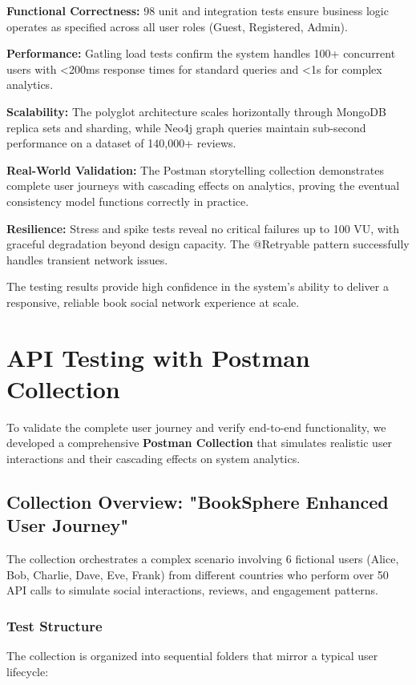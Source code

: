\textbf{Functional Correctness:} 98 unit and integration tests ensure business logic operates as specified across all user roles (Guest, Registered, Admin).

\textbf{Performance:} Gatling load tests confirm the system handles 100+ concurrent users with \textless200ms response times for standard queries and \textless1s for complex analytics.

\textbf{Scalability:} The polyglot architecture scales horizontally through MongoDB replica sets and sharding, while Neo4j graph queries maintain sub-second performance on a dataset of 140,000+ reviews.

\textbf{Real-World Validation:} The Postman storytelling collection demonstrates complete user journeys with cascading effects on analytics, proving the eventual consistency model functions correctly in practice.

\textbf{Resilience:} Stress and spike tests reveal no critical failures up to 100 VU, with graceful degradation beyond design capacity. The @Retryable pattern successfully handles transient network issues.

The testing results provide high confidence in the system's ability to deliver a responsive, reliable book social network experience at scale.


\section{API Testing with Postman Collection}

To validate the complete user journey and verify end-to-end functionality, we developed a comprehensive \textbf{Postman Collection} that simulates realistic user interactions and their cascading effects on system analytics.

\subsection{Collection Overview: "BookSphere Enhanced User Journey"}
The collection orchestrates a complex scenario involving 6 fictional users (Alice, Bob, Charlie, Dave, Eve, Frank) from different countries who perform over 50 API calls to simulate social interactions, reviews, and engagement patterns.

\subsubsection{Test Structure}
The collection is organized into sequential folders that mirror a typical user lifecycle:

